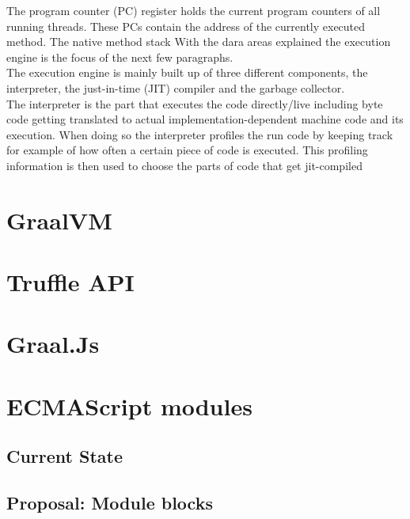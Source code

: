 The program counter (PC) register holds the current program counters of all running threads. These PCs contain the address of the currently executed method.
The native method stack
With the dara areas explained the execution engine is the focus of the next few paragraphs.\\
The execution engine is mainly built up of three different components, the interpreter, the just-in-time (JIT) compiler and the garbage collector.\\
The interpreter is the part that executes the code directly/live including byte code getting translated to actual implementation-dependent machine code and its execution. When doing so the interpreter profiles the run code by keeping track for example of how often a certain piece of code is executed. This profiling information is then used to choose the parts of code that get jit-compiled

\cite{Lindholm}


\section{GraalVM}

\section{Truffle API}

\section{Graal.Js}

\section{ECMAScript modules}
\subsection{Current State}

\subsection{Proposal: Module blocks}